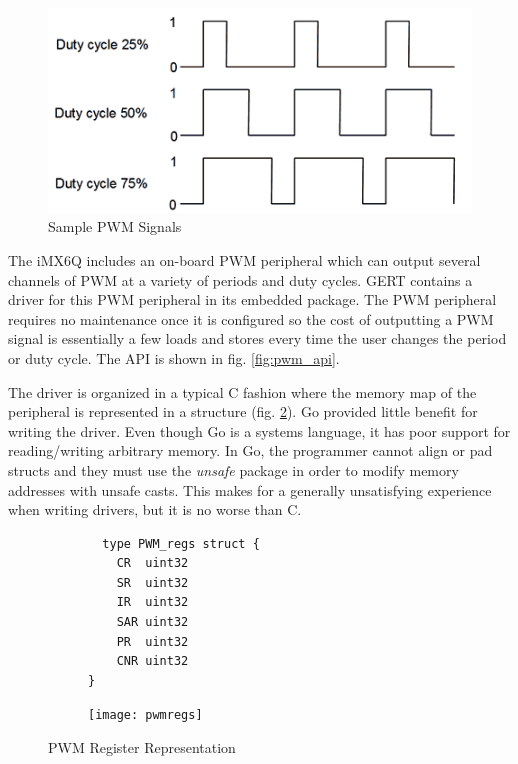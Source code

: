 \begin{figure}[h]
\begin{center}
  \includegraphics[scale=0.5]{pwm}
\end{center}
  \caption{Sample PWM Signals} \label{fig:pwm}
\end{figure}


The iMX6Q includes an on-board PWM peripheral which can output several channels of PWM
at a variety of periods and duty cycles. GERT contains a driver for this PWM peripheral in its embedded
package. The PWM peripheral requires no maintenance once it is configured so the cost of outputting
a PWM signal is essentially a few loads and stores every time the user changes the period or duty cycle.
The API is shown in fig. \ref{fig:pwm_api}.

The driver is organized in a typical C fashion where the memory map of the peripheral is represented in a structure (fig. \ref{fig:pwm_struct}).
Go provided little benefit for writing the driver. Even though Go is a systems language, it has poor
support for reading/writing arbitrary memory. In Go, the programmer cannot align or pad structs
and they must use the \textit{unsafe} package in order to modify memory addresses with unsafe casts. This makes for a generally
unsatisfying experience when writing drivers, but it is no worse than C.


\begin{figure}[h]
  \begin{subfigure}[t!]{0.5\textwidth}
  \begin{lstlisting}
  type PWM_regs struct {
	CR  uint32
	SR  uint32
	IR  uint32
	SAR uint32
	PR  uint32
	CNR uint32
}
  \end{lstlisting}
  \end{subfigure}
  \begin{subfigure}[t!]{0.5\textwidth}
 \texttt{[image: pwmregs]}
  \end{subfigure}
  \caption{PWM Register Representation} \label{fig:pwm_struct}
\end{figure}


